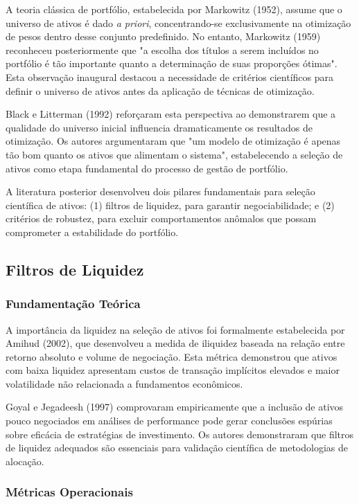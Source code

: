 A teoria clássica de portfólio, estabelecida por Markowitz (1952), assume que o universo de ativos é dado \emph{a priori}, concentrando-se exclusivamente na otimização de pesos dentro desse conjunto predefinido. No entanto, Markowitz (1959) reconheceu posteriormente que "a escolha dos títulos a serem incluídos no portfólio é tão importante quanto a determinação de suas proporções ótimas". Esta observação inaugural destacou a necessidade de critérios científicos para definir o universo de ativos antes da aplicação de técnicas de otimização.

Black e Litterman (1992) reforçaram esta perspectiva ao demonstrarem que a qualidade do universo inicial influencia dramaticamente os resultados de otimização. Os autores argumentaram que "um modelo de otimização é apenas tão bom quanto os ativos que alimentam o sistema", estabelecendo a seleção de ativos como etapa fundamental do processo de gestão de portfólio.

A literatura posterior desenvolveu dois pilares fundamentais para seleção científica de ativos: (1) filtros de liquidez, para garantir negociabilidade; e (2) critérios de robustez, para excluir comportamentos anômalos que possam comprometer a estabilidade do portfólio.

\subsection{Filtros de Liquidez}

\subsubsection{Fundamentação Teórica}

A importância da liquidez na seleção de ativos foi formalmente estabelecida por Amihud (2002), que desenvolveu a medida de iliquidez baseada na relação entre retorno absoluto e volume de negociação. Esta métrica demonstrou que ativos com baixa liquidez apresentam custos de transação implícitos elevados e maior volatilidade não relacionada a fundamentos econômicos.

Goyal e Jegadeesh (1997) comprovaram empiricamente que a inclusão de ativos pouco negociados em análises de performance pode gerar conclusões espúrias sobre eficácia de estratégias de investimento. Os autores demonstraram que filtros de liquidez adequados são essenciais para validação científica de metodologias de alocação.

\subsubsection{Métricas Operacionais}


